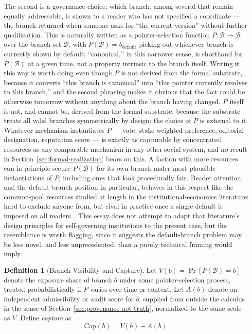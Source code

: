 \documentclass[11pt]{article}
\theoremstyle{definition}
\newtheorem{definition}[theorem]{Definition}
\begin{document}
The second is a governance choice: which branch, among several that remain equally addressable, is shown to a reader who has not specified a coordinate --- the branch returned when someone asks for ``the current version'' without further qualification. This is naturally written as a pointer-selection function $P : \mathcal{B} \to \mathcal{B}$ over the branch set $\mathcal{B}$, with $P(\mathcal{B}) = b_{\mathrm{default}}$ picking out whichever branch is currently shown by default; ``canonical,'' in this narrower sense, is shorthand for $P(\mathcal{B})$ at a given time, not a property intrinsic to the branch itself. Writing it this way is worth doing even though $P$ is not derived from the formal substrate, because it converts ``this branch is canonical'' into ``this pointer currently resolves to this branch,'' and the second phrasing makes it obvious that the fact could be otherwise tomorrow without anything about the branch having changed. $P$ itself is not, and cannot be, derived from the formal substrate, because the substrate treats all valid branches symmetrically by design; the choice of $P$ is external to it. Whatever mechanism instantiates $P$ --- vote, stake-weighted preference, editorial designation, reputation score --- is exactly as capturable by concentrated resources as any comparable mechanism in any other social system, and no result in Section~\ref{sec:formal-realization} bears on this. A faction with more resources can in principle secure $P(\mathcal{B})$ for its own branch under most plausible instantiations of $P$, including ones that look procedurally fair. Reader attention, and the default-branch position in particular, behaves in this respect like the common-pool resources studied at length in the institutional-economics literature: hard to exclude anyone from, but rival in practice once a single default is imposed on all readers~\cite{ostrom1990}. This essay does not attempt to adapt that literature's design principles for self-governing institutions to the present case, but the resemblance is worth flagging, since it suggests the default-branch problem may be less novel, and less unprecedented, than a purely technical framing would imply.

\begin{definition}[Branch Visibility and Capture]
\label{def:branch-capture}
Let $V(b) = \Pr[P(\mathcal{B}) = b]$ denote the exposure share of branch $b$ under some pointer-selection process, treated probabilistically if $P$ varies over time or context. Let $A(b)$ denote an independent admissibility or audit score for $b$, supplied from outside the calculus in the sense of Section~\ref{sec:provenance-not-truth}, normalized to the same scale as $V$. Define \emph{capture} as
\[
\mathrm{Cap}(b) = V(b) - A(b).
\]
\end{definition}
\end{document}

